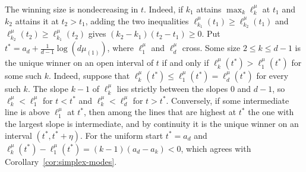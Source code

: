 \begin{remark}\label{rem:start-lines}
The winning size is nondecreasing in $t$. Indeed, if $k_1$ attains
$\max_k\ell^\mu_k$ at $t_1$ and $k_2$ attains it at $t_2>t_1$, adding the two
inequalities $\ell^\mu_{k_1}(t_1)\ge\ell^\mu_{k_2}(t_1)$ and
$\ell^\mu_{k_2}(t_2)\ge\ell^\mu_{k_1}(t_2)$ gives $(k_2-k_1)(t_2-t_1)\ge0$. Put
$t^*=a_d+\frac1{d-1}\log(d\mu_{(1)})$, where $\ell^\mu_1$ and $\ell^\mu_d$ cross.
Some size $2\le k\le d-1$ is the unique winner on an open interval of $t$ if and
only if $\ell^\mu_k(t^*)>\ell^\mu_1(t^*)$ for some such $k$. Indeed, suppose
that $\ell^\mu_k(t^*)\le\ell^\mu_1(t^*)=\ell^\mu_d(t^*)$ for every such $k$.
The slope $k-1$ of $\ell^\mu_k$ lies strictly between the slopes $0$ and $d-1$,
so $\ell^\mu_k<\ell^\mu_1$ for $t<t^*$ and $\ell^\mu_k<\ell^\mu_d$ for $t>t^*$.
Conversely, if some intermediate line is above $\ell^\mu_1$ at $t^*$, then among
the lines that are highest at $t^*$ the one with the largest slope is
intermediate, and by continuity it is the unique winner on an interval
$(t^*,t^*+\eta)$. For the uniform start $t^*=a_d$ and
$\ell^\mu_k(t^*)-\ell^\mu_1(t^*)=(k-1)(a_d-a_k)<0$, which agrees with
Corollary~\ref{cor:simplex-modes}.
\end{remark}

